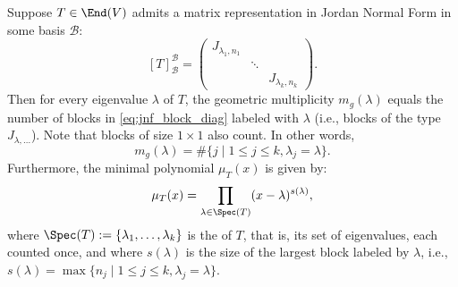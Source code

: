 \begin{corollary}
\label{cor:multiplicities_min_poly_jnf}
Suppose $T \in \End(V)$ admits a matrix representation in Jordan Normal Form in some basis $\mathcal{B}$:
\begin{equation}
\label{eq:jnf_block_diag}
[T]_{\mathcal{B}}^{\mathcal{B}} = \begin{pmatrix} J_{\lambda_1, n_1} & & \\ & \ddots & \\ & & J_{\lambda_k, n_k} \end{pmatrix}.
\end{equation}
Then for every eigenvalue $\lambda$ of $T$, the geometric multiplicity $m_g(\lambda)$ equals the number of blocks in \eqref{eq:jnf_block_diag} labeled with $\lambda$ (i.e., blocks of the type $J_{\lambda, \dots}$). Note that blocks of size $1 \times 1$ also count. In other words,
\[
m_g(\lambda) = \# \{ j \mid 1 \le j \le k, \lambda_j = \lambda \}.
\]
Furthermore, the minimal polynomial $\mu_T(x)$ is given by:
\[
\mu_T(x) = \prod_{\lambda \in \Spec(T)} (x - \lambda)^{s(\lambda)},
\]
where $\Spec(T) := \{ \lambda_1, \dots, \lambda_k \}$ is the  of $T$, that is, its set of eigenvalues, each counted once, and where $s(\lambda)$ is the size of the largest block labeled by $\lambda$, i.e., $s(\lambda) = \max \{ n_j \mid 1 \le j \le k, \lambda_j = \lambda \}$.
\end{corollary}

